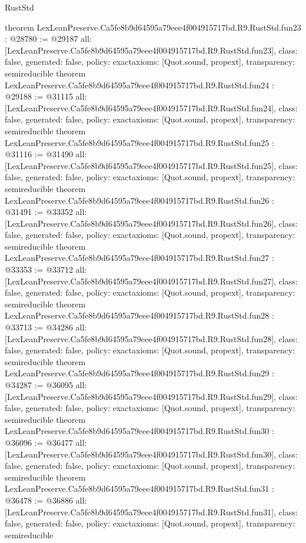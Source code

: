 \begin{lexlean}{RustStd}
\begin{coremodule}
{}
theorem LexLeanPreserve.Ca5fe8b9d64595a79eee4f004915717bd.R9.RustStd.fun23 : @28780 := @29187 {
  all: [LexLeanPreserve.Ca5fe8b9d64595a79eee4f004915717bd.R9.RustStd.fun23],
  class: false,
  generated: false,
  policy: exact{axioms: [Quot.sound, propext]},
  transparency: semireducible
}
theorem LexLeanPreserve.Ca5fe8b9d64595a79eee4f004915717bd.R9.RustStd.fun24 : @29188 := @31115 {
  all: [LexLeanPreserve.Ca5fe8b9d64595a79eee4f004915717bd.R9.RustStd.fun24],
  class: false,
  generated: false,
  policy: exact{axioms: [Quot.sound, propext]},
  transparency: semireducible
}
theorem LexLeanPreserve.Ca5fe8b9d64595a79eee4f004915717bd.R9.RustStd.fun25 : @31116 := @31490 {
  all: [LexLeanPreserve.Ca5fe8b9d64595a79eee4f004915717bd.R9.RustStd.fun25],
  class: false,
  generated: false,
  policy: exact{axioms: [Quot.sound, propext]},
  transparency: semireducible
}
theorem LexLeanPreserve.Ca5fe8b9d64595a79eee4f004915717bd.R9.RustStd.fun26 : @31491 := @33352 {
  all: [LexLeanPreserve.Ca5fe8b9d64595a79eee4f004915717bd.R9.RustStd.fun26],
  class: false,
  generated: false,
  policy: exact{axioms: [Quot.sound, propext]},
  transparency: semireducible
}
theorem LexLeanPreserve.Ca5fe8b9d64595a79eee4f004915717bd.R9.RustStd.fun27 : @33353 := @33712 {
  all: [LexLeanPreserve.Ca5fe8b9d64595a79eee4f004915717bd.R9.RustStd.fun27],
  class: false,
  generated: false,
  policy: exact{axioms: [Quot.sound, propext]},
  transparency: semireducible
}
theorem LexLeanPreserve.Ca5fe8b9d64595a79eee4f004915717bd.R9.RustStd.fun28 : @33713 := @34286 {
  all: [LexLeanPreserve.Ca5fe8b9d64595a79eee4f004915717bd.R9.RustStd.fun28],
  class: false,
  generated: false,
  policy: exact{axioms: [Quot.sound, propext]},
  transparency: semireducible
}
theorem LexLeanPreserve.Ca5fe8b9d64595a79eee4f004915717bd.R9.RustStd.fun29 : @34287 := @36095 {
  all: [LexLeanPreserve.Ca5fe8b9d64595a79eee4f004915717bd.R9.RustStd.fun29],
  class: false,
  generated: false,
  policy: exact{axioms: [Quot.sound, propext]},
  transparency: semireducible
}
theorem LexLeanPreserve.Ca5fe8b9d64595a79eee4f004915717bd.R9.RustStd.fun30 : @36096 := @36477 {
  all: [LexLeanPreserve.Ca5fe8b9d64595a79eee4f004915717bd.R9.RustStd.fun30],
  class: false,
  generated: false,
  policy: exact{axioms: [Quot.sound, propext]},
  transparency: semireducible
}
theorem LexLeanPreserve.Ca5fe8b9d64595a79eee4f004915717bd.R9.RustStd.fun31 : @36478 := @36886 {
  all: [LexLeanPreserve.Ca5fe8b9d64595a79eee4f004915717bd.R9.RustStd.fun31],
  class: false,
  generated: false,
  policy: exact{axioms: [Quot.sound, propext]},
  transparency: semireducible
}
\end{coremodule}
\end{lexlean}
